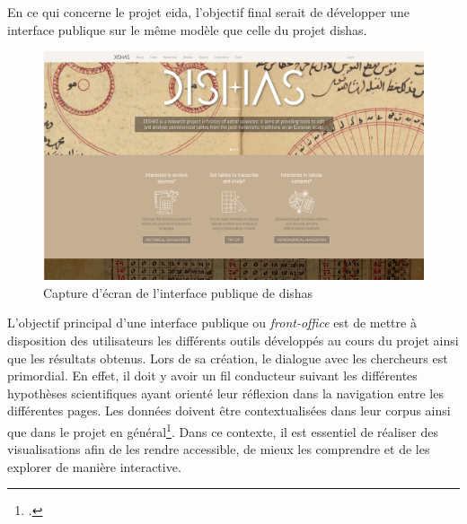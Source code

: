 En ce qui concerne le projet \gls{eida}, l'objectif final serait de développer une interface publique sur le même modèle que celle du projet \gls{dishas}.


\begin{figure}[H]
	\centering
	\includegraphics[width=1\textwidth]{images/dishas.png}
	\caption{Capture d'écran de l'interface publique de \gls{dishas}}
	\label{fig:dishas-interface}
\end{figure}

L'objectif principal d'une interface publique ou \textit{front-office} est de mettre à disposition des utilisateurs les différents outils développés au cours du projet ainsi que les résultats obtenus. Lors de sa création, le dialogue avec les chercheurs est primordial. En effet, il doit y avoir un \og fil conducteur \fg suivant les différentes hypothèses scientifiques ayant orienté leur réflexion dans la navigation entre les différentes pages. Les données doivent être contextualisées dans leur corpus ainsi que dans le projet en général\footcite{albouyMediationDonneesRecherche2019}. Dans ce contexte, il est essentiel de réaliser des visualisations afin de les rendre accessible, de mieux les comprendre et de les explorer de manière interactive. 